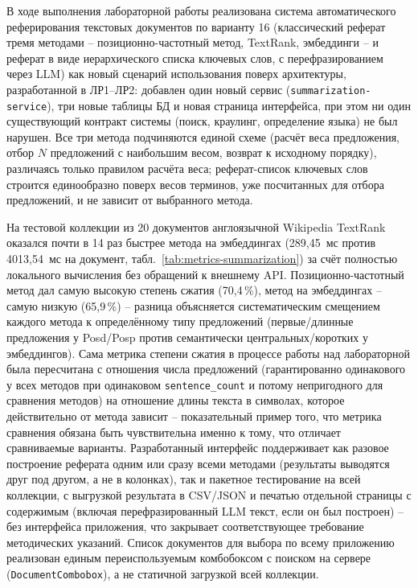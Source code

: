 

В ходе выполнения лабораторной работы реализована система
автоматического реферирования текстовых документов по варианту 16
(классический реферат тремя методами -- позиционно-частотный метод,
TextRank, эмбеддинги -- и реферат в виде иерархического списка
ключевых слов, с перефразированием через LLM) как новый сценарий
использования поверх архитектуры, разработанной в ЛР1--ЛР2: добавлен
один новый сервис (\texttt{summarization-service}), три новые таблицы
БД и новая страница интерфейса, при этом ни один существующий контракт
системы (поиск, краулинг, определение языка) не был нарушен. Все три
метода подчиняются единой схеме (расчёт веса предложения, отбор $N$
предложений с наибольшим весом, возврат к исходному порядку), различаясь
только правилом расчёта веса; реферат-список ключевых слов строится
единообразно поверх весов терминов, уже посчитанных для отбора
предложений, и не зависит от выбранного метода.

На тестовой коллекции из 20 документов англоязычной Wikipedia TextRank
оказался почти в 14 раз быстрее метода на эмбеддингах (289{,}45~мс
против 4013{,}54~мс на документ, табл.~\ref{tab:metrics-summarization})
за счёт полностью локального вычисления без обращений к внешнему
API. Позиционно-частотный метод дал самую высокую степень сжатия
(70{,}4\,\%), метод на эмбеддингах -- самую низкую (65{,}9\,\%) --
разница объясняется систематическим смещением каждого метода к
определённому типу предложений (первые/длинные предложения у
Posd/Posp против семантически центральных/коротких у эмбеддингов). Сама
метрика степени сжатия в процессе работы над лабораторной была
пересчитана с отношения числа предложений (гарантированно одинакового
у всех методов при одинаковом \texttt{sentence\_count} и потому
непригодного для сравнения методов) на отношение длины текста в
символах, которое действительно от метода зависит -- показательный
пример того, что метрика сравнения обязана быть чувствительна именно к
тому, что отличает сравниваемые варианты. Разработанный интерфейс
поддерживает как разовое построение реферата одним или сразу всеми
методами (результаты выводятся друг под другом, а не в колонках), так
и пакетное тестирование на всей коллекции, с выгрузкой результата в
CSV/JSON и печатью отдельной страницы с содержимым (включая
перефразированный LLM текст, если он был построен) -- без интерфейса
приложения, что закрывает соответствующее требование методических
указаний. Список документов для выбора по всему приложению реализован
единым переиспользуемым комбобоксом с поиском на сервере
(\texttt{DocumentCombobox}), а не статичной загрузкой всей коллекции.
